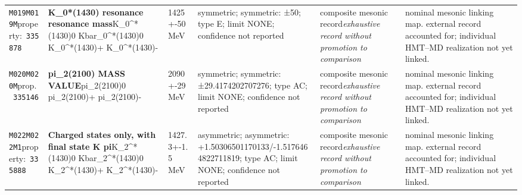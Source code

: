 \begin{landscape}
\begin{longtable}{L{1.85cm}L{4.45cm}L{2.35cm}L{4.05cm}L{3.35cm}L{7.15cm}}
\texttt{M019}\newline \texttt{M019M}\newline property:\ \texttt{335878} & \textbf{K\_\allowbreak{}0*(1430) resonance resonance mass}\newline K\_\allowbreak{}0\textasciicircum{}*(1430)0 \textbar{}\allowbreak{} Kbar\_\allowbreak{}0\textasciicircum{}*(1430)0 \textbar{}\allowbreak{} K\_\allowbreak{}0\textasciicircum{}*(1430)+ \textbar{}\allowbreak{} K\_\allowbreak{}0\textasciicircum{}*(1430)- & 1425+-50\,MeV & symmetric; symmetric: ±50; type E; limit NONE; confidence not reported & composite mesonic record\newline \emph{exhaustive record without promotion to comparison} & nominal mesonic linking map. external record accounted for; individual HMT--MD realization not yet linked. \\
\texttt{M020}\newline \texttt{M020M}\newline prop.\ \texttt{335146} & \textbf{pi\_\allowbreak{}2(2100) MASS VALUE}\newline pi\_\allowbreak{}2(2100)0 \textbar{}\allowbreak{} pi\_\allowbreak{}2(2100)+ \textbar{}\allowbreak{} pi\_\allowbreak{}2(2100)- & 2090+-29\,MeV & symmetric; symmetric: ±29.4174202707276; type AC; limit NONE; confidence not reported & composite mesonic record\newline \emph{exhaustive record without promotion to comparison} & nominal mesonic linking map. external record accounted for; individual HMT--MD realization not yet linked. \\
\texttt{M022}\newline \texttt{M022M1}\newline property:\ \texttt{335888} & \textbf{Charged states only, with final state K pi}\newline K\_\allowbreak{}2\textasciicircum{}*(1430)0 \textbar{}\allowbreak{} Kbar\_\allowbreak{}2\textasciicircum{}*(1430)0 \textbar{}\allowbreak{} K\_\allowbreak{}2\textasciicircum{}*(1430)+ \textbar{}\allowbreak{} K\_\allowbreak{}2\textasciicircum{}*(1430)- & 1427.3+-1.5\,MeV & asymmetric; asymmetric: +1.50306501170133/-1.5176464822711819; type AC; limit NONE; confidence not reported & composite mesonic record\newline \emph{exhaustive record without promotion to comparison} & nominal mesonic linking map. external record accounted for; individual HMT--MD realization not yet linked. \\

\end{longtable}
\end{landscape}
